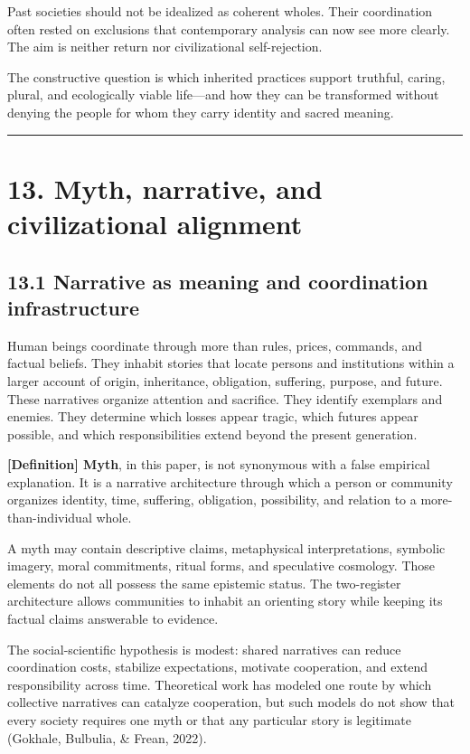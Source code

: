 \documentclass[
  11pt,
]{article}
\begin{document}
Past societies should not be idealized as coherent wholes. Their
coordination often rested on exclusions that contemporary analysis can
now see more clearly. The aim is neither return nor civilizational
self-rejection.

The constructive question is which inherited practices support truthful,
caring, plural, and ecologically viable life---and how they can be
transformed without denying the people for whom they carry identity and
sacred meaning.

\begin{center}\rule{0.5\linewidth}{0.5pt}\end{center}

\section{13. Myth, narrative, and civilizational
alignment}\label{myth-narrative-and-civilizational-alignment}

\subsection{13.1 Narrative as meaning and coordination
infrastructure}\label{narrative-as-meaning-and-coordination-infrastructure}

Human beings coordinate through more than rules, prices, commands, and
factual beliefs. They inhabit stories that locate persons and
institutions within a larger account of origin, inheritance, obligation,
suffering, purpose, and future. These narratives organize attention and
sacrifice. They identify exemplars and enemies. They determine which
losses appear tragic, which futures appear possible, and which
responsibilities extend beyond the present generation.

\textbf{{[}Definition{]} Myth}, in this paper, is not synonymous with a
false empirical explanation. It is a narrative architecture through
which a person or community organizes identity, time, suffering,
obligation, possibility, and relation to a more-than-individual whole.

A myth may contain descriptive claims, metaphysical interpretations,
symbolic imagery, moral commitments, ritual forms, and speculative
cosmology. Those elements do not all possess the same epistemic status.
The two-register architecture allows communities to inhabit an orienting
story while keeping its factual claims answerable to evidence.

The social-scientific hypothesis is modest: shared narratives can reduce
coordination costs, stabilize expectations, motivate cooperation, and
extend responsibility across time. Theoretical work has modeled one
route by which collective narratives can catalyze cooperation, but such
models do not show that every society requires one myth or that any
particular story is legitimate (Gokhale, Bulbulia, \& Frean, 2022).
\end{document}
